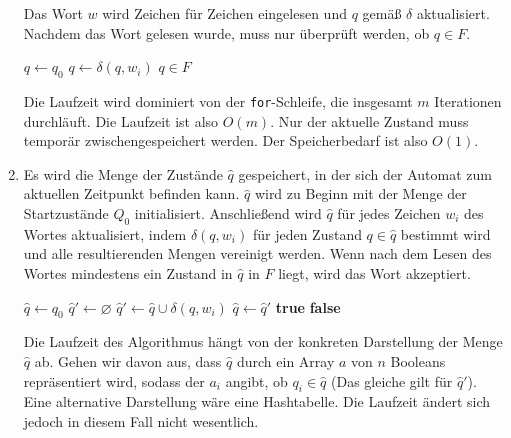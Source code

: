 \documentclass[11pt,a4paper]{article}
\begin{document}
\begin{loesung}
\begin{enumerate}
        Das Wort $w$ wird Zeichen für Zeichen eingelesen und $q$ gemäß $\delta$ aktualisiert.
        Nachdem das Wort gelesen wurde, muss nur überprüft werden, ob $q \in F$.
        \begin{algorithmic}[1]
                \State $q \gets q_0$
                    \State $q \gets \delta(q, w_i)$
                \EndFor
                \State \Return $q \in F$
            \EndProcedure
        \end{algorithmic}
        Die Laufzeit wird dominiert von der \texttt{for}-Schleife, die insgesamt $m$ Iterationen durchläuft.
        Die Laufzeit ist also $O(m)$.
        Nur der aktuelle Zustand muss temporär zwischengespeichert werden.
        Der Speicherbedarf ist also $O(1)$.
        \item 
        Es wird die Menge der Zustände $\hat{q}$ gespeichert, in der sich der Automat zum aktuellen Zeitpunkt befinden kann.
        $\hat{q}$ wird zu Beginn mit der Menge der Startzustände $Q_0$ initialisiert.
        Anschließend wird $\hat{q}$ für jedes Zeichen $w_i$ des Wortes aktualisiert, indem $\delta(q, w_i)$ für jeden Zustand $q \in \hat{q}$ bestimmt wird und alle resultierenden Mengen vereinigt werden.
        Wenn nach dem Lesen des Wortes mindestens ein Zustand in $\hat{q}$ in $F$ liegt, wird das Wort akzeptiert.
        \begin{algorithmic}[1]
                \State $\hat{q} \gets q_0$
                    \State $\hat{q}' \gets \varnothing$
                        \State $\hat{q}' \gets \hat{q} \cup \delta(q, w_i)$
                    \EndFor
                    \State $\hat{q} \gets \hat{q}'$
                \EndFor
                        \State \Return \textbf{true}
                    \EndIf
                \EndFor
                \State \Return \textbf{false}
            \EndProcedure
        \end{algorithmic}
        Die Laufzeit des Algorithmus hängt von der konkreten Darstellung der Menge $\hat{q}$ ab.
        Gehen wir davon aus, dass $\hat{q}$ durch ein Array $a$ von $n$ Booleans repräsentiert wird, sodass der $a_i$ angibt, ob $q_i \in \hat{q}$ (Das gleiche gilt für $\hat{q}'$).
        Eine alternative Darstellung wäre eine Hashtabelle. Die Laufzeit ändert sich jedoch in diesem Fall nicht wesentlich.


\end{enumerate}
\end{loesung}
\end{document}
